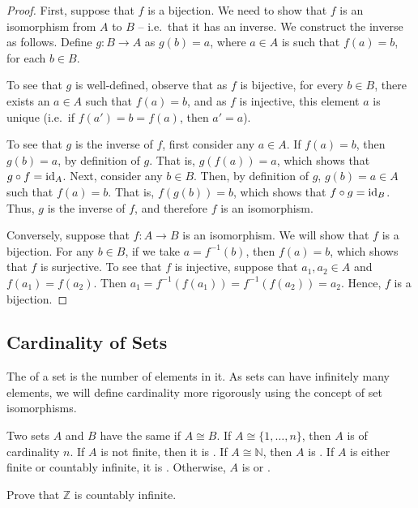 \begin{proof}
First, suppose that $f$ is a bijection. We need to show that $f$ is an isomorphism from $A$ to $B$ -- i.e.\ that it has an inverse. We construct the inverse as follows. Define $g \colon B \to A$ as $g(b) = a$, where $a \in A$ is such that $f(a) = b$, for each $b \in B$.

To see that $g$ is well-defined, observe that as $f$ is bijective, for every $b \in B$, there exists an $a \in A$ such that $f(a) = b$, and as $f$ is injective, this element $a$ is unique (i.e.\ if $f(a') = b = f(a)$, then $a' = a$).

To see that $g$ is the inverse of $f$, first consider any $a \in A$. If $f(a) = b$, then $g(b) = a$, by definition of $g$. That is, $g(f(a)) = a$, which shows that $g \circ f = \mathrm{id}_A$. Next, consider any $b \in B$. Then, by definition of $g$, $g(b) = a \in A$ such that $f(a) = b$. That is, $f(g(b)) = b$, which shows that $f \circ g = \mathrm{id}_B$. Thus, $g$ is the inverse of $f$, and therefore $f$ is an isomorphism.

Conversely, suppose that $f \colon A \to B$ is an isomorphism. We will show that $f$ is a bijection. For any $b \in B$, if we take $a = f^{-1}(b)$, then $f(a) = b$, which shows that $f$ is surjective. To see that $f$ is injective, suppose that $a_1, a_2 \in A$ and $f(a_1) = f(a_2)$. Then $a_1 = f^{-1}(f(a_1)) = f^{-1}(f(a_2)) = a_2$. Hence, $f$ is a bijection.
\end{proof}

\subsection{Cardinality of Sets}\label{subsec:Cardinality}
The  of a set is the number of elements in it. As sets can have infinitely many elements, we will define cardinality more rigorously using the concept of set isomorphisms.

\begin{Definition}
Two sets $A$ and $B$ have the same  if $A \cong B$. If $A \cong \{1, \ldots, n\}$, then $A$ is  of cardinality $n$. If $A$ is not finite, then it is . If $A \cong \mathbb N$, then $A$ is . If $A$ is either finite or countably infinite, it is . Otherwise, $A$ is  or .
\end{Definition}

\begin{Exercise}
Prove that $\mathbb Z$ is countably infinite.
\end{Exercise}

